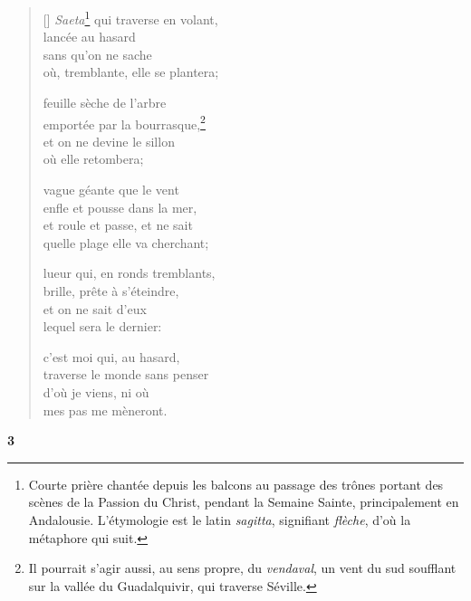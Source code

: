 \documentclass[a4paper,12pt]{book}
\begin{document}
\begin{verse}[\versewidth]
  \emph{Saeta}\footnote{Courte prière chantée
  depuis les balcons au passage des trônes portant des scènes de la
  Passion du Christ, pendant la Semaine Sainte, principalement en
  Andalousie. L'étymologie est le latin \emph{sagitta},
  signifiant \emph{flèche}, d'où la métaphore qui suit.} qui traverse en volant, \\
  lancée au hasard \\
  sans qu'on ne sache \\
  où, tremblante, elle se plantera;

  feuille sèche de l'arbre \\
  emportée par la bourrasque,\footnote{Il pourrait s'agir aussi, au
  sens propre, du \emph{vendaval}, un vent du sud soufflant sur la
  vallée du Guadalquivir, qui traverse Séville.} \\
  et on ne devine le sillon \\
  où elle retombera;

  vague géante que le vent \\
  enfle et pousse dans la mer, \\
  et roule et passe, et ne sait \\
  quelle plage elle va cherchant;

  lueur qui, en ronds tremblants, \\
  brille, prête à s'éteindre, \\
  et on ne sait d'eux \\
  lequel sera le dernier:

  c'est moi qui, au hasard, \\
  traverse le monde sans penser \\
  d'où je viens, ni où \\
  mes pas me mèneront.
\end{verse}

\bigskip

\begin{center}
  \textbf{3}
\end{center}

\settowidth{\versewidth}{comme au travers d'un tulle,}
\end{document}
